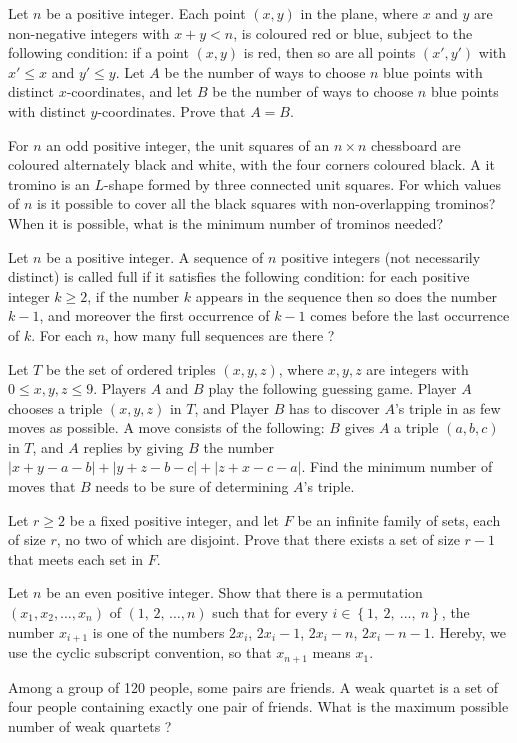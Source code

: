 \item[\textbf{C1.}]Let $n$ be a positive integer. Each point $(x,y)$ in the plane, where $x$ and $y$ are non-negative integers with $x+y<n$,  is coloured red or blue, subject to the following condition: if a point $(x,y)$ is red, then so are all points $(x',y')$ with $x'\leq x$ and $y'\leq y$. Let $A$ be the number of ways to choose $n$ blue points with distinct $x$-coordinates, and let $B$ be the number of ways to choose $n$ blue points with distinct $y$-coordinates. Prove that $A=B$.

\item[\textbf{C2.}]For $n$ an odd positive integer, the unit squares of an $n\times n$ chessboard are coloured alternately black and white, with the four corners coloured black. A it tromino is an $L$-shape formed by three connected unit squares. For which values of $n$ is it possible to cover all the black squares with non-overlapping trominos?  When it is possible, what is the minimum number of trominos needed?

\item[\textbf{C3.}]Let $n$ be a positive integer. A sequence of $n$ positive integers (not necessarily distinct) is called full if it satisfies the following condition: for each positive integer $k\geq2$,  if the number $k$ appears in the sequence then so does the number $k-1$,  and moreover the first occurrence of $k-1$ comes before the last occurrence of $k$. For each $n$,  how many full sequences are there ?

\item[\textbf{C4.}]Let $T$ be the set of ordered triples $(x,y,z)$,  where $x,y,z$ are integers with $0\leq x,y,z\leq9$. Players $A$ and $B$ play the following guessing game. Player $A$ chooses a triple $(x,y,z)$ in $T$,  and Player $B$ has to discover $A$'s triple in as few moves as possible.  A move consists of the following: $B$ gives $A$ a triple $(a,b,c)$ in $T$,  and $A$ replies by giving $B$ the number $\left|x+y-a-b\right |+\left|y+z-b-c\right|+\left|z+x-c-a\right|$. Find the minimum number of moves that $B$ needs to be sure of determining $A$'s  triple.

\item[\textbf{C5.}]Let $r\geq2$ be a fixed positive integer, and let $F$ be an infinite family of sets, each of size $r$,  no two of which are disjoint. Prove that there exists a set of size $r-1$ that meets each set in $F$.

\item[\textbf{C6.}]Let $n$ be an even positive integer. Show that there is a permutation $\left(x_{1},x_{2},\ldots,x_{n}\right)$ of $\left(1,\,2,\,\ldots,n\right)$ such that for every $i\in\left\{1,\ 2,\ ...,\ n\right\}$,  the number $x_{i+1}$ is one of the numbers $2x_{i}$,  $2x_{i}-1$,  $2x_{i}-n$,  $2x_{i}-n-1$. Hereby, we use the cyclic subscript convention, so that $x_{n+1}$ means $x_{1}$.

\item[\textbf{C7.}]Among a group of 120 people, some pairs are friends. A weak quartet is a set of four people containing exactly one pair of friends. What is the maximum possible number of weak quartets ?